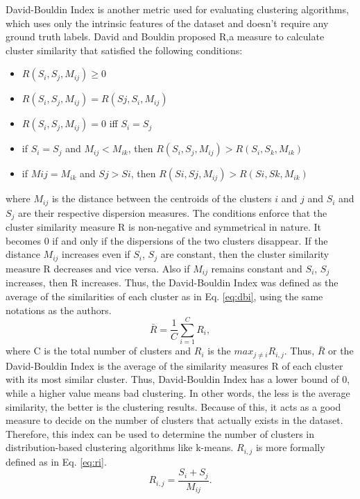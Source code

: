 David-Bouldin Index is another metric used for evaluating clustering algorithms, which uses only the intrinsic features of the dataset and doesn't require any ground truth labels. David and Bouldin proposed R,a measure to calculate cluster similarity that satisfied the following conditions\cite{vergani2018soft}:
\begin{itemize}
  \item $R(S_i, S_j, M_{ij}) \geq 0$
  \item $R(S_i, S_j, M_{ij}) = R(Sj, S_i, M_{ij})$
  \item $R(S_i, S_j, M_{ij}) = 0$ iff $S_i = S_j$
  \item if $S_i = S_j$ and $M_{ij} < M_{ik}$, then $R(S_i, S_j,M_{ij}) > R(S_i, S_k,M_{ik})$  
  \item if $Mij = M_{ik}$ and $Sj > Si$, then $R(Si, Sj, M_{ij}) > R(Si, Sk, M_{ik})$
\end{itemize}
where $M_{ij}$ is the distance between the centroids of the clusters $i$ and $j$ and $S_i$ and $S_j$ are their respective dispersion measures. The conditions enforce that the cluster similarity measure R is non-negative and symmetrical in nature. It becomes 0 if and only if the dispersions of the two clusters disappear. If the distance $M_{ij}$ increases even if $S_i$, $S_j$ are constant, then the cluster similarity measure R decreases and vice versa. Also if $M_{ij}$ remains constant and $S_i$, $S_j$ increases, then R increases. Thus, the David-Bouldin Index was defined as the average of the similarities of each cluster as in Eq. \ref{eq:dbi}, using the same notations as the authors.
\begin{equation}
  \label{eq:dbi}
  \mathit{\bar{R}}= \mathit{\frac{1}{C}\sum_{i=1}^{C}R_i}, 
\end{equation}
where C is the total number of clusters and $R_i$ is the $max_{j \neq i}{R_{i,j}}$. Thus, $\bar{R}$ or the David-Bouldin Index is the average of the similarity measures R of each cluster with its most similar cluster. Thus, David-Bouldin Index has a lower bound of 0, while a higher value means bad clustering. In other words, the less is the average similarity, the better is the clustering results. Because of this, it acts as a good measure to decide on the number of clusters that actually exists in the dataset. Therefore, this index can be used to determine the number of clusters in distribution-based clustering algorithms like k-means. $R_{i,j}$ is more formally defined as in Eq. \ref{eq:ri}.
\begin{equation}
  \label{eq:ri}
  \mathit{R_{i,j}}= \mathit{\frac{S_i + S_j}{M_{ij}}}. 
\end{equation}
